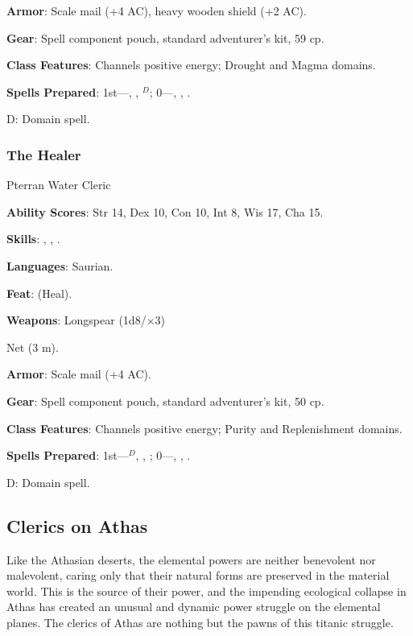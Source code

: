 \textbf{Armor}: Scale mail (+4 AC), heavy wooden shield (+2 AC).

\textbf{Gear}: Spell component pouch, standard adventurer's kit, 59 cp.

\textbf{Class Features}: Channels positive energy; Drought and Magma domains.

\textbf{Spells Prepared}: 1st---, , $^{D}$; 0---, , .

D: Domain spell.

\subsubsection{The Healer}

Pterran Water Cleric

\textbf{Ability Scores}: Str 14, Dex 10, Con 10, Int 8, Wis 17, Cha 15.

\textbf{Skills}: , , .

\textbf{Languages}: Saurian.

\textbf{Feat}:  (Heal).

\textbf{Weapons}: Longspear (1d8/$\times$3)

Net (3 m).

\textbf{Armor}: Scale mail (+4 AC).

\textbf{Gear}: Spell component pouch, standard adventurer's kit, 50 cp.

\textbf{Class Features}: Channels positive energy; Purity and Replenishment domains.

\textbf{Spells Prepared}: 1st---$^{D}$, , ; 0---, , .

D: Domain spell.

\subsection{Clerics on Athas}

Like the Athasian deserts, the elemental powers are neither benevolent nor malevolent, caring only that their natural forms are preserved in the material world. This is the source of their power, and the impending ecological collapse in Athas has created an unusual and dynamic power struggle on the elemental planes. The clerics of Athas are nothing but the pawns of this titanic struggle.

